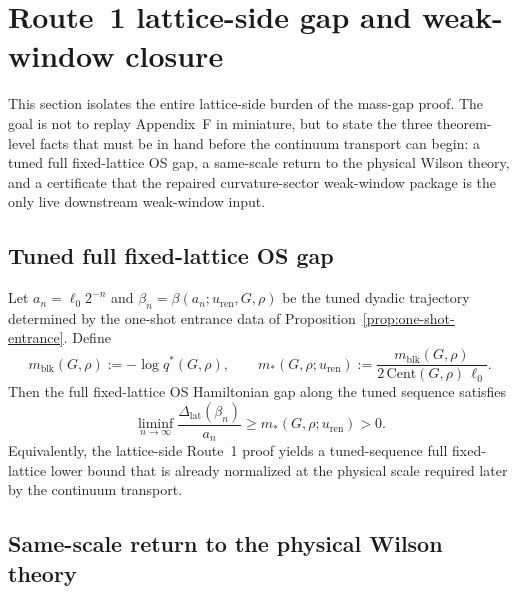 \section{Route~1 lattice-side gap and weak-window closure}\label{sec:route1}

This section isolates the entire lattice-side burden of the mass-gap proof. The goal is not to replay Appendix~F in miniature, but to state the three theorem-level facts that must be in hand before the continuum transport can begin: a tuned full fixed-lattice OS gap, a same-scale return to the physical Wilson theory, and a certificate that the repaired curvature-sector weak-window package is the only live downstream weak-window input.

\subsection{Tuned full fixed-lattice OS gap}

\begin{proposition}\label{prop:lattice-gap}
Let $a_n=\ell_0 2^{-n}$ and $\beta_n=\beta(a_n;u_{\mathrm{ren}},G,\rho)$ be the tuned dyadic trajectory determined by the one-shot entrance data of Proposition~\ref{prop:one-shot-entrance}. Define
\[
  m_{\mathrm{blk}}(G,\rho):=-\log q^*(G,\rho),\qquad m_*(G,\rho;u_{\mathrm{ren}}):=\frac{m_{\mathrm{blk}}(G,\rho)}{2\,\mathrm{Cent}(G,\rho)\,\ell_0}.
\]
Then the full fixed-lattice OS Hamiltonian gap along the tuned sequence satisfies
\[
  \liminf_{n\to\infty}\frac{\Delta_{\mathrm{lat}}(\beta_n)}{a_n}\geq m_*(G,\rho;u_{\mathrm{ren}})>0.
\]
Equivalently, the lattice-side Route~1 proof yields a tuned-sequence full fixed-lattice lower bound that is already normalized at the physical scale required later by the continuum transport.
\end{proposition}

\subsection{Same-scale return to the physical Wilson theory}

